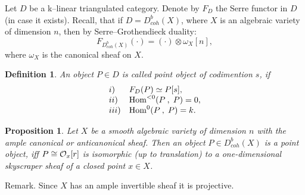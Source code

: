\documentclass[12pt]{article}
\newtheorem{proposition}[theorem]{Proposition}
\newtheorem{definition}[theorem]{Definition}
\def\db#1{ D^b_{coh}({#1})}
\def\o#1{{\cal O}_{#1}}
\begin{document}
Let $D$ be a k--linear triangulated category. Denote by $F_D$ the Serre functor in $D$ (in case it exists). Recall, that if $D=\db{X}$, where $X$ is an algebraic variety of dimension $n$, then by Serre--Grothendieck duality:
\begin{equation}\label{Ser}
F_{\db{X}}(\cdot)= (\cdot)\otimes \omega_X[n],
\end{equation}
where $\omega_X$ is the canonical sheaf on $X$.
\begin{definition}\label{po}
An object $P\in D$ is called {\sf point object} of codimention $s$, if
$$
\begin{array}{ll}
i)& F_D(P)\simeq P[s],\\
ii)& {\rm Hom}^{<0}(P\:,\; P)=0,\\
iii)& {\rm Hom}^{0}(P\:,\; P)=k.
\end{array}
$$
\end{definition}
\begin{proposition}\label{rp}
Let $X$ be a smooth algebraic variety of dimension $n$ with the ample canonical or anticanonical sheaf. Then an object $P\in \db{X}$ is a point object, iff $P\cong{\o x}[r]$ is isomorphic (up to translation) to a one-dimensional skyscraper sheaf of a closed point $x\in X$.
\end{proposition}
{\sc Remark.} Since $X$ has an ample invertible sheaf it
is projective.
\end{document}
